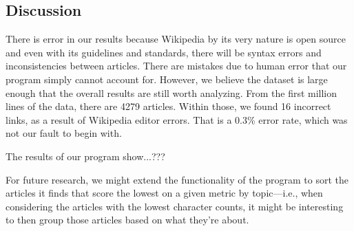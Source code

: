 \documentclass[fontsize=12pt]{article}
\begin{document}
\begin{multicols}{2}
    \section{Discussion}
    There is error in our results because Wikipedia by its very nature is open source and even with its guidelines and standards, there will be syntax errors and inconsistencies between articles. There are mistakes due to human error that our program simply cannot account for. However, we believe the dataset is large enough that the overall results are still worth analyzing. From the first million lines of the data, there are 4279 articles. Within those, we found 16 incorrect links, as a result of Wikipedia editor errors. That is a 0.3\% error rate, which was not our fault to begin with.
    
    
    The results of our program show...???
    
    For future research, we might extend the functionality of the program to sort the articles it finds that score the lowest on a given metric by topic---i.e., when considering the articles with the lowest character counts, it might be interesting to then group those articles based on what they're about. %
    

\end{multicols}

\linespread{2}
\newpage
\nocite{*}
\printbibliography[title={\centering References}]
\end{document}

